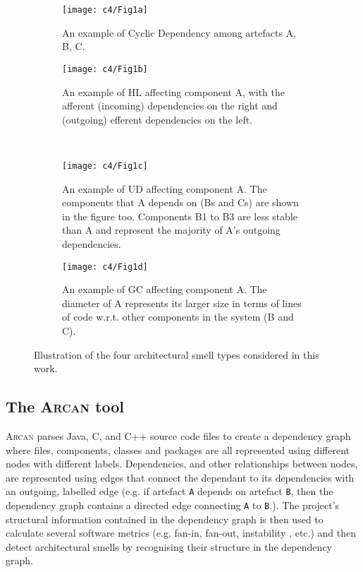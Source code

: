 \begin{figure}[t]
    \centering
    \begin{subfigure}[t]{0.45\linewidth}
        \centering
        \texttt{[image: c4/Fig1a]}
        \caption{An example of Cyclic Dependency among artefacts A, B, C.}\label{c2:fig:cd}
    \end{subfigure}
    \hfill
    \begin{subfigure}[t]{0.45\linewidth}
        \centering
        \texttt{[image: c4/Fig1b]}
        \caption{An example of HL affecting component A, with the afferent (incoming) dependencies on the right and (outgoing) efferent dependencies on the left.}\label{c2:fig:hl}
    \end{subfigure}
    \\
    \begin{subfigure}[t]{0.45\linewidth}
        \centering
        \texttt{[image: c4/Fig1c]}
        \caption{An example of UD affecting component A. The components that A depends on (Bs and Cs) are shown in the figure too. Components B1 to B3 are less stable than A and represent the majority of A's outgoing dependencies.}\label{c2:fig:ud}
    \end{subfigure}
    \hfill
    \begin{subfigure}[t]{0.45\linewidth}
        \centering
        \texttt{[image: c4/Fig1d]}
        \caption{An example of GC affecting component A. The diameter of A represents its larger size in terms of lines of code w.r.t. other components in the system (B and C).}\label{c2:fig:gc}
    \end{subfigure}
    \caption{Illustration of the four architectural smell types considered in this work.}
    \label{c4:fig:architectural-smells} 
\end{figure}

\subsection{The \textsc{Arcan} tool}\label{c2:sec:arcan}
\textsc{Arcan} parses Java, C, and C++ source code files to create a dependency graph where files, components, classes and packages are all represented using different nodes with different labels. Dependencies, and other relationships between nodes, are represented using edges that connect the dependant to its dependencies with an outgoing, labelled edge (e.g. if artefact \texttt{A} depends on artefact \texttt{B}, then the dependency graph contains a directed edge connecting \texttt{A} to \texttt{B}.). 
The project's structural information contained in the dependency graph is then used to calculate several software metrics (e.g. fan-in, fan-out, instability \cite{Martin2018}, etc.) and then detect architectural smells by recognising their structure in the dependency graph.

